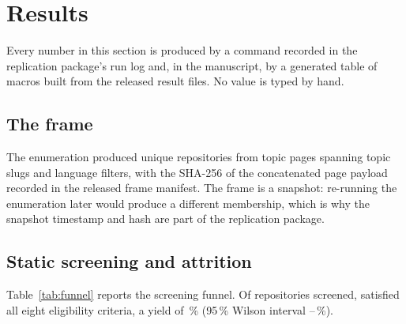 \section{Results}
\label{sec:results}

Every number in this section is produced by a command recorded in the replication package's run log
and, in the manuscript, by a generated table of macros built from the released result files. No value is typed by hand.

\subsection{The frame}

The enumeration produced \Nframe{} unique repositories from \Ntopicpages{} topic pages spanning
\topicslugs{} topic slugs and \langfilters{} language filters, with the SHA-256 of the concatenated
page payload recorded in the released frame manifest. The frame is a snapshot: re-running the
enumeration later would produce a different membership, which is why the snapshot timestamp and hash
are part of the replication package.

\subsection{Static screening and attrition}

Table~\ref{tab:funnel} reports the screening funnel. Of \Nscreened{} repositories screened,
\Neligible{} satisfied all eight eligibility criteria, a yield of \YieldPct\,\% (95\,\% Wilson interval
\YieldLo--\YieldHi\,\%).

